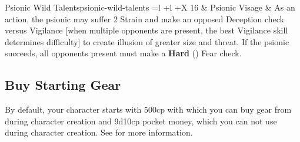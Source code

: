 \begin{multicols}{2}
\begin{table}[!htb]
\begin{GenesysTable}{Psionic Wild Talents}{psionic-wild-talents}{ =l +l +X}
16  & Psionic Visage      & As an action, the psionic may suffer 2 Strain and make an opposed Deception check versus Vigilance
                            [when multiple opponents are present, the best Vigilance skill determines difficulty] to
                            create illusion of greater size and threat. If the psionic succeeds, all opponents present must
                            make a \textbf{Hard} (\difficulty\difficulty\difficulty) Fear check.\\
\end{GenesysTable}
\end{table}

\subsection{Buy Starting Gear}
By default, your character starts with 500cp with which you can buy gear from during character creation and 9d10cp pocket money, which you can not use during character creation.
See  for more information.

\end{multicols}
